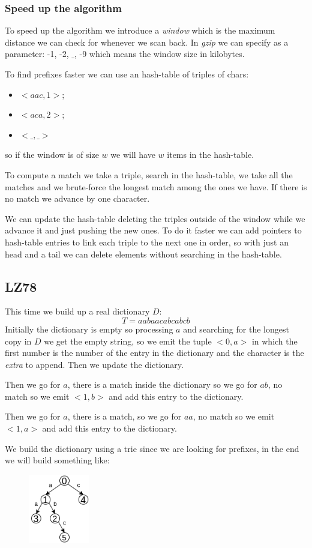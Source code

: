 \subsubsection{Speed up the algorithm}
To speed up the algorithm we introduce a \emph{window} which is the maximum distance we can check for whenever we scan back.
In \emph{gzip} we can specify as a parameter: -1, -2, $\_$, -9 which means the window size in kilobytes.

To find prefixes faster we can use an hash-table of triples of chars:
\begin{itemize}
    \item $<aac, 1>$;
    \item $<aca, 2>$;
    \item $<\_, \_>$
\end{itemize}
so if the window is of size $w$ we will have $w$ items in the hash-table.

To compute a match we take a triple, search in the hash-table, we take all the matches and we brute-force the longest match among the ones we have.
If there is no match we advance by one character.

We can update the hash-table deleting the triples outside of the window while we advance it and just pushing the new ones.
To do it faster we can add pointers to hash-table entries to link each triple to the next one in order, so with just an head and a tail we can delete elements without searching in the hash-table.

\subsection{LZ78}
This time we build up a real dictionary $D$:
$$
    T = aabaacabcabcb
$$
Initially the dictionary is empty so processing $a$ and searching for the longest copy in $D$ we get the empty string, so we emit the tuple $<0, a>$ in which the first number is the number of the entry in the dictionary and the character is the \emph{extra} to append.
Then we update the dictionary.

Then we go for $a$, there is a match inside the dictionary so we go for $ab$, no match so we emit $<1, b>$ and add this entry to the dictionary.

Then we go for $a$, there is a match, so we go for $aa$, no match so we emit $<1, a>$ and add this entry to the dictionary.

We build the dictionary using a trie since we are looking for prefixes, in the end we will build something like:
\begin{figure}[H]
    \centering
    \includegraphics[width=100px]{images/10_Data_compression/LZ78_dictionary.png}
\end{figure}

